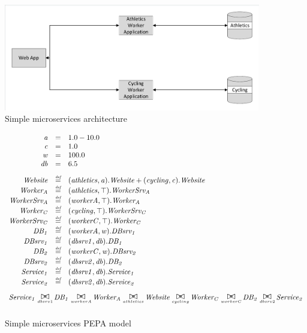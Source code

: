 \begin{figure}
	\centering
	\includegraphics[trim = 5 5 5 5, clip, width=\textwidth]{img/simplemicro}
	\caption{Simple microservices architecture}
	\label{figure:simplemicro_architecture}
\end{figure}

\begin{figure}
	\centering
	\begin{displaymath}
		\begin{array}{rcl}
			\mathit{a} & = & 1.0 - 10.0\\
			\mathit{c} & = & 1.0\\
			\mathit{w} & = & 100.0\\
			\mathit{db} & = & 6.5\\
			[2.0ex]		\mathit{Website} & \rmdef & (\mathit{athletics},\mathit{a}).\mathit{Website}+(\mathit{cycling},\mathit{c}).\mathit{Website}\\
			\mathit{Worker_A} & \rmdef & (\mathit{athletics},\top).\mathit{WorkerSrv_A}\\
			\mathit{WorkerSrv_A} & \rmdef & (\mathit{workerA},\top).\mathit{Worker_A}\\
			\mathit{Worker_C} & \rmdef & (\mathit{cycling},\top).\mathit{WorkerSrv_C}\\
			\mathit{WorkerSrv_C} & \rmdef & (\mathit{workerC},\top).\mathit{Worker_C}\\
			\mathit{DB_1} & \rmdef & (\mathit{workerA},\mathit{w}).\mathit{DBsrv_1}\\
			\mathit{DBsrv_1} & \rmdef & (\mathit{dbsrv1},\mathit{db}).\mathit{DB_1}\\
			\mathit{DB_2} & \rmdef & (\mathit{workerC},\mathit{w}).\mathit{DBsrv_2}\\
			\mathit{DBsrv_2} & \rmdef & (\mathit{dbsrv2},\mathit{db}).\mathit{DB_2}\\
			\mathit{Service_1} & \rmdef & (\mathit{dbsrv1},\mathit{db}).\mathit{Service_1}\\
			\mathit{Service_2} & \rmdef & (\mathit{dbsrv2},\mathit{db}).\mathit{Service_2}\\
			[2.0ex]		\multicolumn{3}{l}{\mathit{Service_1}\sync{dbsrv1}\mathit{DB_1}\sync{workerA}\mathit{Worker_A}\sync{athletics}\mathit{Website}\sync{cycling}\mathit{Worker_C}\sync{workerC}\mathit{DB_2}\sync{dbsrv2}\mathit{Service_2}}\\
			[2.0ex]	\end{array}
	\end{displaymath}
	\caption{Simple microservices PEPA model}
	\label{figure:simplemicro}
\end{figure}

